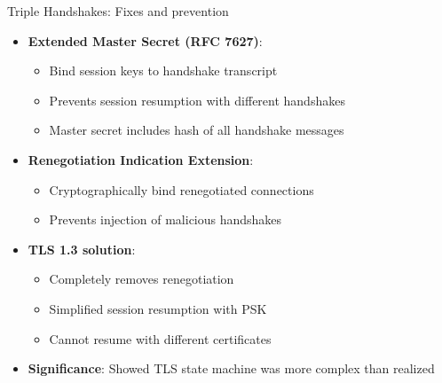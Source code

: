 \documentclass[aspectratio=169, lualatex, handout]{beamer}
\begin{document}
\begin{frame}{Triple Handshakes: Fixes and prevention}
	\begin{itemize}[<+->]
		\item \textbf{Extended Master Secret (RFC 7627)}:
		      \begin{itemize}
			      \item Bind session keys to handshake transcript
			      \item Prevents session resumption with different handshakes
			      \item Master secret includes hash of all handshake messages
		      \end{itemize}
		\item \textbf{Renegotiation Indication Extension}:
		      \begin{itemize}
			      \item Cryptographically bind renegotiated connections
			      \item Prevents injection of malicious handshakes
		      \end{itemize}
		\item \textbf{TLS 1.3 solution}:
		      \begin{itemize}
			      \item Completely removes renegotiation
			      \item Simplified session resumption with PSK
			      \item Cannot resume with different certificates
		      \end{itemize}
		\item \textbf{Significance}: Showed TLS state machine was more complex than realized
	\end{itemize}
\end{frame}
\end{document}
